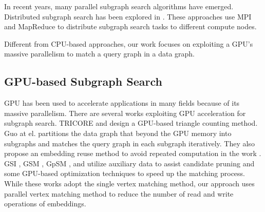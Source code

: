 In recent years, many parallel subgraph search algorithms have emerged.  Distributed subgraph search has been explored in \cite{afrati2013enumerating, shao2014parallel,shi2020graphpi,talukder2016distributed,sun2018parallelizing,plantenga2013inexact,reza2018prunejuice}. These approaches use MPI and MapReduce to distribute subgraph search tasks to different compute nodes.

Different from CPU-based approaches, our work focuses on exploiting a GPU's massive parallelism to match a query graph in a data graph.

\subsection{GPU-based Subgraph Search}
GPU has been used to accelerate applications in many fields because of its massive parallelism. There are several works exploiting GPU acceleration for subgraph search. TRICORE \cite{hu2018tricore}  and \cite{green2014fast} design a GPU-based triangle counting method. Guo at el. \cite{guo2020gpu} partitions the data graph that beyond the GPU memory into subgraphs and matches the query graph in each subgraph iteratively. They also propose an embedding reuse method to avoid repeated computation in the work \cite{guo2020exploiting}. GSI \cite{zeng2020gsi}, GSM \cite{wang2020fast}, GpSM \cite{tran2015fast}, and \cite{lin2016network} utilize auxiliary data to assist candidate pruning and some GPU-based optimization techniques to speed up the matching process. While these works adopt the single vertex matching method, our approach uses parallel vertex matching method to reduce the number of read and write operations of  embeddings.

